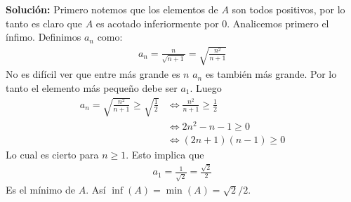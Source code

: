 \documentclass[12pt]{book}
\begin{document}
\textbf{Solución:}
Primero notemos que los elementos de $A$ son todos positivos, por lo tanto es claro que $A$ es acotado inferiormente por $0$. Analicemos primero el ínfimo. Definimos $a_n$ como:
\begin{align*}
    a_n=\frac{n}{\sqrt{n+1}}=\sqrt{\frac{n^2}{n+1}}
\end{align*}
No es difícil ver que entre más grande es $n$ $a_n$ es también más grande. Por lo tanto el elemento más pequeño debe ser $a_1$. Luego
\begin{align*}
    a_n=\sqrt{\frac{n^2}{n+1}} \geq \sqrt{\frac{1}{2}} &\Longleftrightarrow \frac{n^2}{n+1} \geq \frac{1}{2} \\
    &\Longleftrightarrow 2n^2-n-1 \geq 0 \\
    &\Longleftrightarrow(2n+1)(n-1) \geq 0
\end{align*}
Lo cual es cierto para $n\geq 1$. Esto implica que 
\begin{align*}
    a_1=\frac{1}{\sqrt{2}}=\frac{\sqrt{2}}{2}
\end{align*}
Es el mínimo de $A$. Así $\inf(A)=\min(A)=\sqrt{2}/2$.
\end{document}
